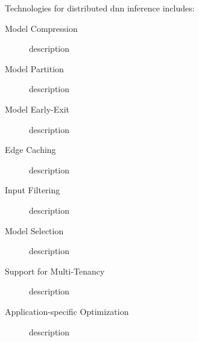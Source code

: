 Technologies for distributed \gls{dnn} inference includes:

\begin{description}
	\item[Model Compression] description \cite{courbariaux_binaryconnect:_2015}
	\item[Model Partition] description \cite{eshratifar_bottlenet:_2019}
	\item[Model Early-Exit] description \cite{teerapittayanon_branchynet:_2016} \cite{teerapittayanon_distributed_2017}
	\item[Edge Caching] description
	\item[Input Filtering] description
	\item[Model Selection] description
	\item[Support for Multi-Tenancy] description
	\item[Application-specific Optimization] description
\end{description}

